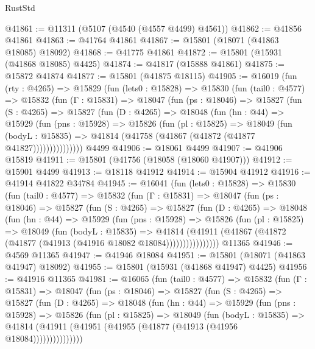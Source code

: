 \begin{lexlean}{RustStd}
\begin{coremodule}
@41861 := @11311 (@5107 (@4540 (@4557 @4499) @4561))
@41862 := @41856 @41861
@41863 := @41764 @41861
@41867 := @15801 (@18071 (@41863 @18085) @18092)
@41868 := @41775 @41861
@41872 := @15801 (@15931 (@41868 @18085) @4425)
@41874 := @41817 (@15888 @41861)
@41875 := @15872 @41874
@41877 := @15801 (@41875 @18115)
@41905 := @16019
    (fun (rty : @4265) =>
    @15829
      (fun (lets0 : @15828) =>
      @15830
        (fun (tail0 : @4577) =>
        @15832
          (fun (Γ : @15831) =>
          @18047
            (fun (ps : @18046) =>
            @15827
              (fun (S : @4265) =>
              @15827
                (fun (D : @4265) =>
                @18048
                  (fun (hn : @44) =>
                  @15929
                    (fun (pns : @15928) =>
                    @15826
                      (fun (pl : @15825) =>
                      @18049
                        (fun (bodyL : @15835) =>
                        @41814 (@41758 (@41867 (@41872 (@41877 @41827)))))))))))))))
    @4499
@41906 := @18061 @4499
@41907 := @41906 @15819
@41911 := @15801 (@41756 (@18058 (@18060 @41907)))
@41912 := @15901 @4499
@41913 := @18118 @41912
@41914 := @15904 @41912
@41916 := @41914 @41822 @34784
@41945 := @16041
    (fun (lets0 : @15828) =>
    @15830
      (fun (tail0 : @4577) =>
      @15832
        (fun (Γ : @15831) =>
        @18047
          (fun (ps : @18046) =>
          @15827
            (fun (S : @4265) =>
            @15827
              (fun (D : @4265) =>
              @18048
                (fun (hn : @44) =>
                @15929
                  (fun (pns : @15928) =>
                  @15826
                    (fun (pl : @15825) =>
                    @18049
                      (fun (bodyL : @15835) =>
                      @41814
                        (@41911
                          (@41867 (@41872 (@41877 (@41913 (@41916 @18082 @18084))))))))))))))))
    @11365
@41946 := @4569 @11365
@41947 := @41946 @18084
@41951 := @15801 (@18071 (@41863 @41947) @18092)
@41955 := @15801 (@15931 (@41868 @41947) @4425)
@41956 := @41916 @11365
@41981 := @16065
    (fun (tail0 : @4577) =>
    @15832
      (fun (Γ : @15831) =>
      @18047
        (fun (ps : @18046) =>
        @15827
          (fun (S : @4265) =>
          @15827
            (fun (D : @4265) =>
            @18048
              (fun (hn : @44) =>
              @15929
                (fun (pns : @15928) =>
                @15826
                  (fun (pl : @15825) =>
                  @18049
                    (fun (bodyL : @15835) =>
                    @41814 (@41911 (@41951 (@41955 (@41877 (@41913 (@41956 @18084)))))))))))))))

\end{coremodule}
\end{lexlean}
